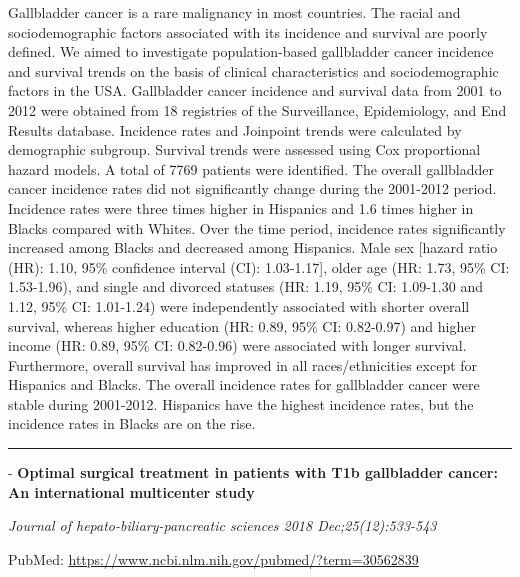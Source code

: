 \documentclass[]{article}
\begin{document}
Gallbladder cancer is a rare malignancy in most countries. The racial
and sociodemographic factors associated with its incidence and survival
are poorly defined. We aimed to investigate population-based gallbladder
cancer incidence and survival trends on the basis of clinical
characteristics and sociodemographic factors in the USA. Gallbladder
cancer incidence and survival data from 2001 to 2012 were obtained from
18 registries of the Surveillance, Epidemiology, and End Results
database. Incidence rates and Joinpoint trends were calculated by
demographic subgroup. Survival trends were assessed using Cox
proportional hazard models. A total of 7769 patients were identified.
The overall gallbladder cancer incidence rates did not significantly
change during the 2001-2012 period. Incidence rates were three times
higher in Hispanics and 1.6 times higher in Blacks compared with Whites.
Over the time period, incidence rates significantly increased among
Blacks and decreased among Hispanics. Male sex {[}hazard ratio (HR):
1.10, 95\% confidence interval (CI): 1.03-1.17{]}, older age (HR: 1.73,
95\% CI: 1.53-1.96), and single and divorced statuses (HR: 1.19, 95\%
CI: 1.09-1.30 and 1.12, 95\% CI: 1.01-1.24) were independently
associated with shorter overall survival, whereas higher education (HR:
0.89, 95\% CI: 0.82-0.97) and higher income (HR: 0.89, 95\% CI:
0.82-0.96) were associated with longer survival. Furthermore, overall
survival has improved in all races/ethnicities except for Hispanics and
Blacks. The overall incidence rates for gallbladder cancer were stable
during 2001-2012. Hispanics have the highest incidence rates, but the
incidence rates in Blacks are on the rise.

{}

{}

\begin{center}\rule{0.5\linewidth}{\linethickness}\end{center}

 - \textbf{Optimal surgical treatment in patients with T1b gallbladder
cancer: An international multicenter study}

\emph{Journal of hepato-biliary-pancreatic sciences 2018
Dec;25(12):533-543}

PubMed: \url{https://www.ncbi.nlm.nih.gov/pubmed/?term=30562839}
\end{document}

